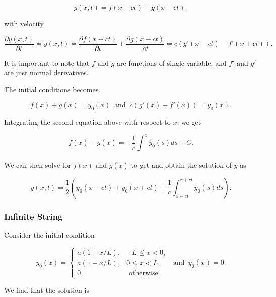 \documentclass[a4paper,12pt]{report}
\begin{document}
\begin{equation}
	y(x,t) = f(x-ct) + g(x+ct),
\end{equation}

with velocity

\begin{equation}
	\frac{\partial y(x,t)}{\partial t} = \dot{y}(x,t) = \frac{\partial f(x-ct)}{\partial t} + \frac{\partial g(x-ct)}{\partial t} = c(g'(x-ct) - f'(x+ct)).
\end{equation}

It is important to note that \(f \text { and } g\) are functions of single variable, and \(f' \text { and } g'\) are just normal derivatives. 

The initial conditions becomes 

\begin{equation}
	f(x)+g(x) = y_0 (x) ~\text { and }~ c\left(g'(x) - f'(x)\right) = \dot{y_0 }(x).
\end{equation}

Integrating the second equation above with respect to \(x\), we get 

\begin{equation}
	f(x) - g(x) = - \frac{1}{c}\int_{}^{x} \dot{y_0 }(s)ds + C.
\end{equation}

We can then solve for \(f(x) \text { and } g(x)\) to get and obtain the solution of \(y\) as 

\begin{equation}
	y(x,t) = \frac{1}{2}\left( y_0 (x-ct) + y_0 (x+ct) + \frac{1}{c} \int_{x-ct}^{x+ct} \dot{y_0 }(s)ds    \right).
\end{equation}

\subsubsection{Infinite String}

Consider the initial condition 

\begin{equation}
	y_0 (x) = \begin{cases} a\left(1+x /L \right),& -L \le x < 0, \\ a\left(1-x /L \right),& 0 \le x < L, \\ 0,& \text{ otherwise}. \end{cases} ~\text { and }~ \dot{y_0} (x) = 0.   
\end{equation}

We find that the solution is 
\end{document}
